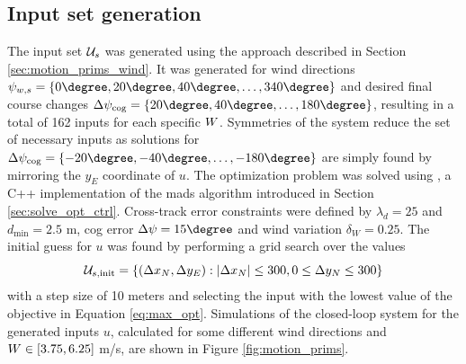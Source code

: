 \subsection{Input set generation}
The input set $\mathcal{U}_s$ was generated using the approach described in Section \ref{sec:motion_prims_wind}. 
It was generated for wind directions $\psi_{w,s}=\{0\degree,20\degree,40\degree,\hdots,340\degree\}$ and desired final course changes
$\Delta\cog=\{20\degree,40\degree,\hdots,180\degree\}$, resulting in a total of 162 inputs for each specific $W$. Symmetries of the system reduce the set of necessary inputs
as solutions for $\Delta\cog=\{-20\degree,-40\degree,\hdots,-180\degree\}$ are simply found by mirroring the $y_E$ coordinate of $u$.
The optimization problem was solved using  \cite{nomad}, a C++ implementation of the \ac{mads} algorithm introduced in Section \ref{sec:solve_opt_ctrl}.
Cross-track error constraints were defined by $\lambda_d=25$ and $d_{\text{min}}=2.5$ m, \ac{cog} error $\Delta\psi=15\degree$ and wind variation $\delta_W=0.25$. The initial guess for $u$ 
was found by performing a grid search over the values
\begin{equation}
    \mathcal{U}_{s,\text{init}}=\{(\Delta x_N,\Delta y_E): |\Delta x_N| \leq 300, 0\leq \Delta y_N \leq 300\}
\end{equation}
with a step size of 10 meters and selecting the input with the lowest value of the objective in Equation \eqref{eq:max_opt}.
Simulations of the closed-loop system for the generated inputs $u$, calculated for some different wind directions and $W\in[3.75, 6.25]$ m/s, are shown in Figure \ref{fig:motion_prims}.

